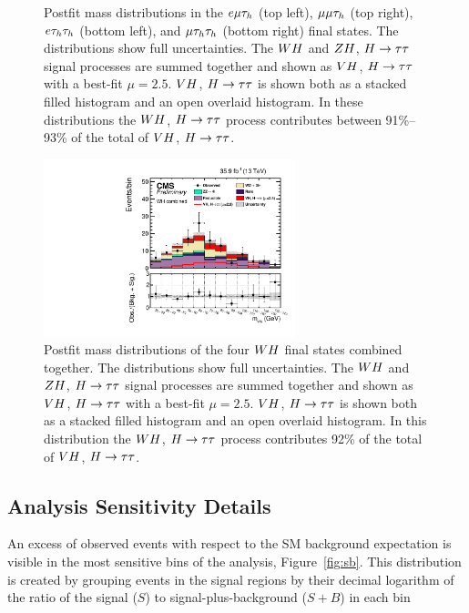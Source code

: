 \begin{figure}[h!]
\begin{center}
 \end{center}
 \caption{Postfit mass distributions in the $e\mu\tau_{h}$ (top left),
 $\mu\mu\tau_{h}$ (top right), $e\tau_{h}\tau_{h}$ (bottom left), and
 $\mu\tau_{h}\tau_{h}$ (bottom right) final states.
 The distributions show full uncertainties.
 The $WH$ and $ZH$, $H\to\tau\tau$ signal processes are summed together and 
 shown as $VH$, $H\to\tau\tau$ with a best-fit $\mu = 2.5$. $VH$, $H\to\tau\tau$ is shown both as 
 a stacked filled histogram and an open overlaid histogram. In these distributions 
 the $WH$, $H\to\tau\tau$ process contributes between 91\%--93\% of the total of $VH$, $H\to\tau\tau$.
 }
 \label{fig:mass_whs}
\end{figure}

\begin{figure}[h!]
 \begin{center}
  \includegraphics[width=0.65\textwidth]{higgs_to_taus_vh/plots/wh/wh_postfit.pdf}
 \end{center}
 \caption{Postfit mass distributions of the four $WH$ final states
 combined together. 
 The distributions show full uncertainties.
 The $WH$ and $ZH$, $H\to\tau\tau$ signal processes are summed together and 
 shown as $VH$, $H\to\tau\tau$ with a best-fit $\mu = 2.5$. $VH$, $H\to\tau\tau$ is shown both as 
 a stacked filled histogram and an open overlaid histogram. In this distribution 
 the $WH$, $H\to\tau\tau$ process contributes 92\% of the total of $VH$, $H\to\tau\tau$.
 }
 \label{fig:mass_wh}
\end{figure}


\subsection{Analysis Sensitivity Details}
An excess of observed events with respect to the SM background expectation is 
visible in the most sensitive bins of the analysis, Figure~\ref{fig:sb}.
This distribution is created by grouping events in the signal regions 
by their decimal logarithm of the ratio of the 
signal ($S$) to signal-plus-background ($S+B$) in each bin

